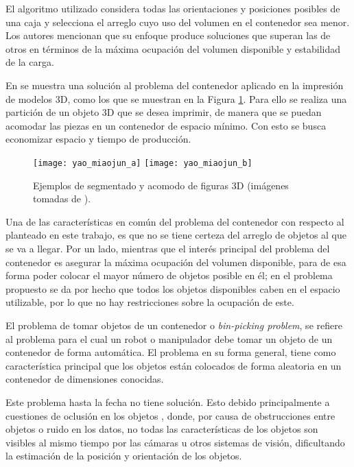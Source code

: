 El algoritmo utilizado considera todas las orientaciones y posiciones posibles de una caja y selecciona el arreglo cuyo uso del volumen en el contenedor sea menor.
Los autores mencionan que su enfoque produce soluciones que superan las de otros en términos de la máxima ocupación del volumen disponible y estabilidad de la carga.

En \cite{10.1145/2816795.2818064} se muestra una solución al problema del contenedor aplicado en la impresión de modelos 3D, como los que se muestran en la Figura \ref{fig:10.1145/2816795.2818064}.
Para ello se realiza una partición de un objeto 3D que se desea imprimir, de manera que se puedan acomodar las piezas en un contenedor de espacio mínimo.
Con esto se busca economizar espacio y tiempo de producción.
%
\begin{figure}[H]
	\texttt{[image: yao\_miaojun\_a]}%
	\hspace{1cm}%
	\texttt{[image: yao\_miaojun\_b]}%
	\caption{Ejemplos de segmentado y acomodo de figuras 3D (imágenes tomadas de \cite{10.1145/2816795.2818064}).}%
	\label{fig:10.1145/2816795.2818064}%
\end{figure}
%
Una de las características en común del problema del contenedor con respecto al planteado en este trabajo, es que no se tiene certeza del arreglo de objetos al que se va a llegar.
Por un lado, mientras que el interés principal del problema del contenedor es asegurar la máxima ocupación del volumen disponible, para de esa forma poder colocar el mayor número de objetos posible en él; en el problema propuesto se da por hecho que todos los objetos disponibles caben en el espacio utilizable, por lo que no hay restricciones sobre la ocupación de este.

El problema de tomar objetos de un contenedor o \textit{bin-picking problem}, se refiere al problema para el cual un robot o manipulador debe tomar un objeto de un contenedor de forma automática.
El problema en su forma general, tiene como característica principal que los objetos están colocados de forma aleatoria en un contenedor de dimensiones conocidas.

Este problema hasta la fecha no tiene solución.
Esto debido principalmente a cuestiones de oclusión en los objetos \cite{1699272}, donde, por causa de obstrucciones entre objetos o ruido en los datos, no todas las características de los objetos son visibles al mismo tiempo por las cámaras u otros sistemas de visión, dificultando la estimación de la posición y orientación de los objetos.

